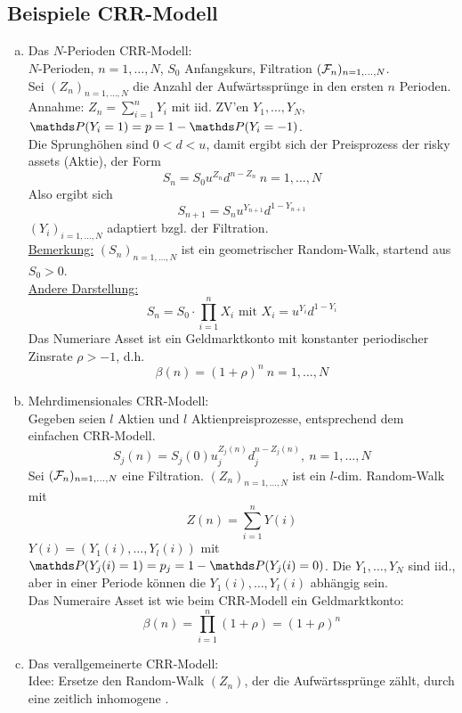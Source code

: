 \subsection{Beispiele CRR-Modell}
\label{sub:bsp_crr}
\begin{enumerate}[(a)]
	\item Das $N$-Perioden CRR-Modell:\\
	$N$-Perioden, $n=1,\dots,N$, $S_0$ Anfangskurs, Filtration $(\mathcal{F}_n)_{n=1,\dots,N}$.\\
	Sei $(Z_n)_{n=1,\dots,N}$ die Anzahl der Aufwärtssprünge in den ersten $n$ Perioden.\\
	Annahme: $Z_n=\sum_{i=1}^{n}Y_i$ mit iid. ZV'en $Y_1,\dots,Y_N$, $\Pw(Y_i=1)=p=1-\Pw(Y_i=-1)$.\\
	Die Sprunghöhen sind $0<d<u$, damit ergibt sich der Preisprozess der risky assets (Aktie), der Form 
	\[
	S_n=S_0u^{Z_n}d^{n-Z_n}~ n=1,\dots,N	
	\]
	Also ergibt sich
	\[
	S_{n+1}=S_nu^{Y_{n+1}}d^{1-Y_{n+1}}
	\]
	$(Y_i)_{i=1,\dots,N}$ adaptiert bzgl. der Filtration.\\
	\uline{Bemerkung:} $(S_n)_{n=1,\dots,N}$ ist ein geometrischer Random-Walk, startend aus $S_0>0$.\\
	\uline{Andere Darstellung:}
	\[
	S_n=S_0\cdot \prod_{i=1}^{n}X_i \text{ mit } X_i=u^{Y_i}d^{1-Y_i}
	\]
	Das Numeriare Asset ist ein Geldmarktkonto mit konstanter periodischer Zinsrate $\rho>-1$, d.h.
	\[
	\beta(n)=(1+\rho)^n ~ n=1,\dots,N
	\]
	\item Mehrdimensionales CRR-Modell:\\
	Gegeben seien $l$ Aktien und $l$ Aktienpreisprozesse, entsprechend dem einfachen CRR-Modell.
	\[
	S_j(n) = S_j(0)u_j^{Z_j(n)}d_j^{n-Z_j(n)},~ n=1,\dots, N
	\]
	Sei $(\mathcal{F}_n)_{n=1,\dots,N}$ eine Filtration. $(Z_n)_{n=1,\dots,N}$ ist ein $l$-dim. Random-Walk mit 
	\[
	Z(n)=\sum_{i=1}^{n}Y(i)
	\]
	$Y(i)=(Y_1(i),\dots,Y_l(i))$ mit $\Pw(Y_j(i)=1)=p_j=1-\Pw(Y_j(i)=0)$. 
	Die $Y_1,\dots,Y_N$ sind iid., aber in einer Periode können die $Y_1(i),\dots,Y_l(i)$ abhängig sein.\\
	Das Numeraire Asset ist wie beim CRR-Modell ein Geldmarktkonto:
	\[
	\beta(n)=\prod_{i=1}^{n}(1+\rho)=(1+\rho)^n
	\]
	\item Das verallgemeinerte CRR-Modell:\\
	Idee: Ersetze den Random-Walk $(Z_n)$, der die Aufwärtssprünge zählt, durch eine zeitlich inhomogene .\\

\end{enumerate}

